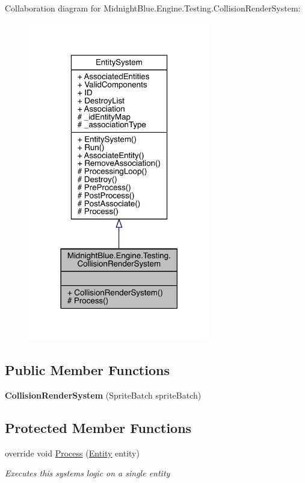 Collaboration diagram for Midnight\+Blue.\+Engine.\+Testing.\+Collision\+Render\+System\+:
\nopagebreak
\begin{figure}[H]
\begin{center}
\leavevmode
\includegraphics[width=225pt]{class_midnight_blue_1_1_engine_1_1_testing_1_1_collision_render_system__coll__graph}
\end{center}
\end{figure}
\subsection*{Public Member Functions}
\begin{DoxyCompactItemize}
\item 
\hypertarget{class_midnight_blue_1_1_engine_1_1_testing_1_1_collision_render_system_a3d4f5fbf2d71ffc44df7712ed8df98d8}{}\label{class_midnight_blue_1_1_engine_1_1_testing_1_1_collision_render_system_a3d4f5fbf2d71ffc44df7712ed8df98d8} 
{\bfseries Collision\+Render\+System} (Sprite\+Batch sprite\+Batch)
\end{DoxyCompactItemize}
\subsection*{Protected Member Functions}
\begin{DoxyCompactItemize}
\item 
override void \hyperlink{class_midnight_blue_1_1_engine_1_1_testing_1_1_collision_render_system_aac900f09888531eaad6453b8534f99ab}{Process} (\hyperlink{class_midnight_blue_1_1_engine_1_1_entity_component_1_1_entity}{Entity} entity)
\begin{DoxyCompactList}\small\item\em Executes this systems logic on a single entity \end{DoxyCompactList}\end{DoxyCompactItemize}

